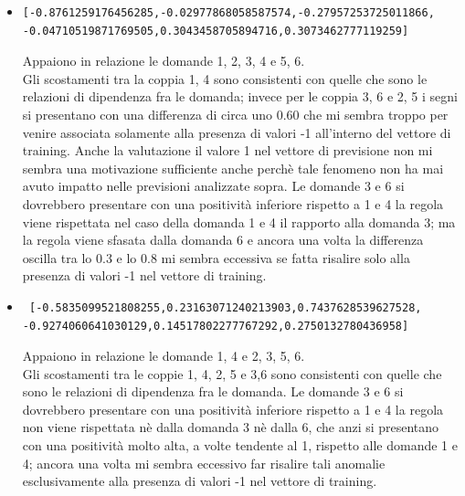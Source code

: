 \begin{itemize}
\item \begin{verbatim}[-0.8761259176456285,-0.02977868058587574,-0.27957253725011866,
-0.04710519871769505,0.3043458705894716,0.3073462777119259]
\end{verbatim}
Appaiono in relazione le domande 1, 2, 3, 4  e 5, 6.\\
Gli scostamenti tra la coppia 1, 4 sono consistenti con quelle che sono le relazioni di dipendenza fra le domanda; invece per le coppia 3, 6 e 2, 5 i segni si presentano con una differenza di circa uno 0.60 che mi sembra troppo per venire associata solamente alla presenza di valori -1 all'interno del vettore di training. Anche la valutazione il valore 1 nel vettore di previsione non mi sembra una motivazione sufficiente anche perch\`e tale fenomeno non ha mai avuto impatto nelle previsioni analizzate sopra.
Le domande 3 e 6 si dovrebbero presentare con una positivit\`a inferiore rispetto a 1 e 4 la regola viene rispettata nel caso della domanda 1 e 4 il rapporto alla domanda 3; ma la regola viene sfasata dalla domanda 6 e ancora una volta la differenza oscilla tra lo 0.3 e lo 0.8 mi sembra eccessiva se fatta risalire solo alla presenza di valori -1 nel vettore di training.

\item \begin{verbatim} [-0.5835099521808255,0.23163071240213903,0.7437628539627528,
-0.9274060641030129,0.14517802277767292,0.2750132780436958]
\end{verbatim}
Appaiono in relazione le domande 1, 4 e 2, 3, 5, 6.\\
Gli scostamenti tra le coppie 1, 4, 2, 5 e 3,6  sono consistenti con quelle che sono le relazioni di dipendenza fra le domanda.
Le domande 3 e 6 si dovrebbero presentare con una positivit\`a inferiore rispetto a 1 e 4 la regola non viene rispettata n\`e dalla domanda 3 n\`e dalla 6, che anzi si presentano con una positivit\`a molto alta, a volte tendente al 1, rispetto alle domande 1 e 4; ancora una volta mi sembra eccessivo far risalire tali anomalie esclusivamente alla presenza di valori -1 nel vettore di training.


\end{itemize}
